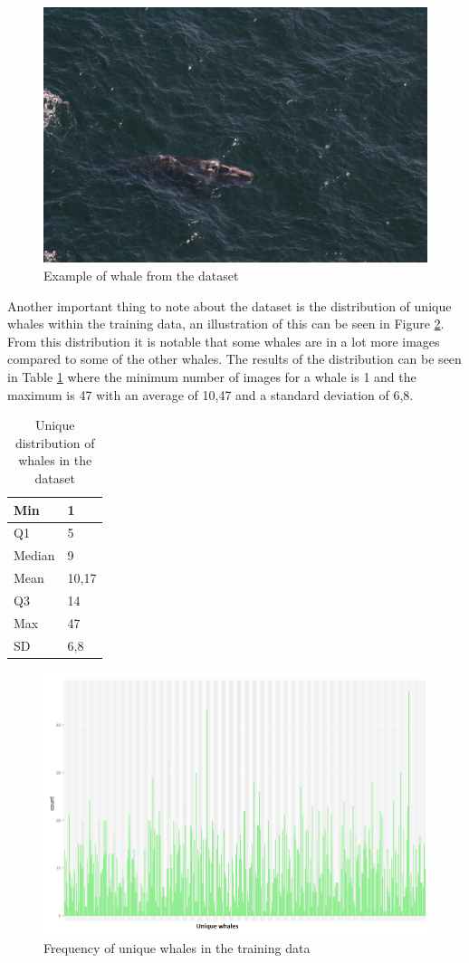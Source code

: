 \begin{figure}
	\centering
	\includegraphics[width=\linewidth]{Images/w_7489}
	\caption{Example of whale from the dataset}
	\label{fig:whale-example}
\end{figure}

Another important thing to note about the dataset is the distribution of unique whales within the training data, an illustration of this can be seen in Figure \ref{fig:whale-frequency}. From this distribution it is notable that some whales are in a lot more images compared to some of the other whales. The results of the distribution can be seen in Table \ref{table:whale-distribution} where the minimum number of images for a whale is 1 and the maximum is 47 with an average of 10,47 and a standard deviation of 6,8.

\begin{table}
	\centering
	\caption{Unique distribution of whales in the dataset}
	\label{table:whale-distribution}
	\begin{tabularx}{\linewidth}{|l|l|}
		\hline
		Min & 1 \\ \hline
		Q1 & 5 \\ \hline
		Median & 9 \\ \hline
		Mean & 10,17 \\ \hline
		Q3 & 14 \\ \hline
		Max & 47 \\ \hline
		SD & 6,8 \\ \hline
	\end{tabularx}
\end{table}

\begin{figure}
	\centering
	\includegraphics[width=\linewidth]{Images/FrequencyPlot}
	\caption{Frequency of unique whales in the training data}
	\label{fig:whale-frequency}
\end{figure}	